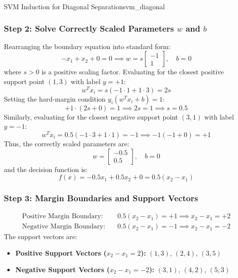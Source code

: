 \begin{example}{SVM Induction for Diagonal Separation}{svm_diagonal}
\subsubsection{Step 2: Solve Correctly Scaled Parameters \texorpdfstring{$w$}{w} and \texorpdfstring{$b$}{b}}
Rearranging the boundary equation into standard form:
\begin{equation}
-x_1 + x_2 + 0 = 0 \implies w = s \begin{bmatrix} -1 \\ 1 \end{bmatrix}, \quad b = 0
\end{equation}
where $s > 0$ is a positive scaling factor.
Evaluating for the closest positive support point $(1, 3)$ with label $y = +1$:
\begin{equation}
w^T x_i = s (-1 \cdot 1 + 1 \cdot 3) = 2s
\end{equation}
Setting the hard-margin condition $y_i (w^T x_i + b) = 1$:
\begin{equation}
+1 \cdot (2s + 0) = 1 \implies 2s = 1 \implies s = 0.5
\end{equation}
Similarly, evaluating for the closest negative support point $(3, 1)$ with label $y = -1$:
\begin{equation}
w^T x_i = 0.5(-1 \cdot 3 + 1 \cdot 1) = -1 \implies -1(-1 + 0) = +1
\end{equation}
Thus, the correctly scaled parameters are:
\begin{equation}
w = \begin{bmatrix} -0.5 \\ 0.5 \end{bmatrix}, \quad b = 0
\end{equation}
and the decision function is:
\begin{equation}
f(x) = -0.5 x_1 + 0.5 x_2 + 0 = 0.5(x_2 - x_1)
\end{equation}

\subsubsection{Step 3: Margin Boundaries and Support Vectors}
\begin{align}
\text{Positive Margin Boundary:} \quad & 0.5(x_2 - x_1) = +1 \implies x_2 - x_1 = +2 \\
\text{Negative Margin Boundary:} \quad & 0.5(x_2 - x_1) = -1 \implies x_2 - x_1 = -2
\end{align}
The support vectors are:
\begin{itemize}
    \item \textbf{Positive Support Vectors ($x_2 - x_1 = 2$):} $(1, 3),\, (2, 4),\, (3, 5)$
    \item \textbf{Negative Support Vectors ($x_2 - x_1 = -2$):} $(3, 1),\, (4, 2),\, (5, 3)$
\end{itemize}


\end{example}
